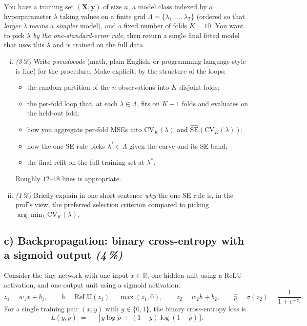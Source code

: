 \documentclass[11pt,a4paper]{article}
\newcommand{\subpoints}[1]{\textit{(#1\,\%)}}
\begin{document}
You have a training set $(\mathbf{X}, \mathbf{y})$ of size $n$, a model class indexed by a hyperparameter $\lambda$ taking values on a finite grid $\Lambda = \{\lambda_1, \dots, \lambda_T\}$ (ordered so that \emph{larger} $\lambda$ means a \emph{simpler} model), and a fixed number of folds $K = 10$. You want to pick $\lambda$ \emph{by the one-standard-error rule}, then return a single final fitted model that uses this $\lambda$ and is trained on the full data.

\begin{enumerate}[(i)]
  \item \subpoints{3} Write \emph{pseudocode} (math, plain English, or programming-language-style is fine) for the procedure. Make explicit, by the structure of the loops:
  \begin{itemize}
    \item the random partition of the $n$ observations into $K$ disjoint folds;
    \item the per-fold loop that, at each $\lambda \in \Lambda$, fits on $K-1$ folds and evaluates on the held-out fold;
    \item how you aggregate per-fold MSEs into $\mathrm{CV}_K(\lambda)$ and $\widehat{\mathrm{SE}}(\mathrm{CV}_K(\lambda))$;
    \item how the one-SE rule picks $\lambda^* \in \Lambda$ given the curve and its SE band;
    \item the final refit on the full training set at $\lambda^*$.
  \end{itemize}
  Roughly $12$--$18$ lines is appropriate.
  \item \subpoints{1} Briefly explain in one short sentence \emph{why} the one-SE rule is, in the prof's view, the preferred selection criterion compared to picking $\arg\min_\lambda \mathrm{CV}_K(\lambda)$.
\end{enumerate}

\subsection*{c) Backpropagation: binary cross-entropy with a sigmoid output \subpoints{4}}

Consider the tiny network with one input $x \in \mathbb{R}$, one hidden unit using a ReLU activation, and one output unit using a sigmoid activation:
$$z_1 = w_1 x + b_1,\qquad h = \mathrm{ReLU}(z_1) = \max(z_1, 0),\qquad z_2 = w_2 h + b_2,\qquad \hat p = \sigma(z_2) = \frac{1}{1 + e^{-z_2}}.$$
For a single training pair $(x, y)$ with $y \in \{0, 1\}$, the binary cross-entropy loss is
$$L(y, \hat p) \;=\; -\bigl[\, y \log \hat p \,+\, (1 - y) \log (1 - \hat p)\,\bigr].$$
\end{document}
